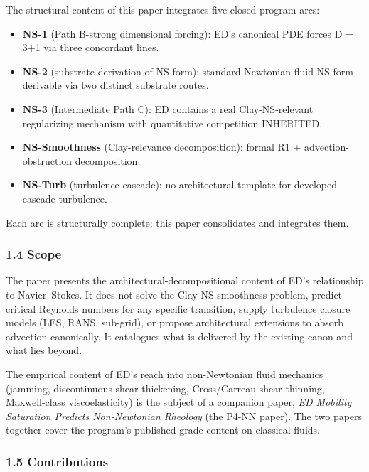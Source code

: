 \documentclass[
  11pt,a4paper]{article}
\providecommand{\tightlist}{%
  \setlength{\itemsep}{0pt}\setlength{\parskip}{0pt}}
\begin{document}
The structural content of this paper integrates five closed program
arcs:

\begin{itemize}
\tightlist
\item
  \textbf{NS-1} (Path B-strong dimensional forcing): ED's canonical PDE
  forces D = 3+1 via three concordant lines.
\item
  \textbf{NS-2} (substrate derivation of NS form): standard
  Newtonian-fluid NS form derivable via two distinct substrate routes.
\item
  \textbf{NS-3} (Intermediate Path C): ED contains a real
  Clay-NS-relevant regularizing mechanism with quantitative competition
  INHERITED.
\item
  \textbf{NS-Smoothness} (Clay-relevance decomposition): formal R1 +
  advection-obstruction decomposition.
\item
  \textbf{NS-Turb} (turbulence cascade): no architectural template for
  developed-cascade turbulence.
\end{itemize}

Each arc is structurally complete; this paper consolidates and
integrates them.

\subsubsection{1.4 Scope}\label{scope}

The paper presents the architectural-decompositional content of ED's
relationship to Navier--Stokes. It does not solve the Clay-NS smoothness
problem, predict critical Reynolds numbers for any specific transition,
supply turbulence closure models (LES, RANS, sub-grid), or propose
architectural extensions to absorb advection canonically. It catalogues
what is delivered by the existing canon and what lies beyond.

The empirical content of ED's reach into non-Newtonian fluid mechanics
(jamming, discontinuous shear-thickening, Cross/Carreau shear-thinning,
Maxwell-class viscoelasticity) is the subject of a companion paper,
\emph{ED Mobility Saturation Predicts Non-Newtonian Rheology} (the P4-NN
paper). The two papers together cover the program's published-grade
content on classical fluids.

\subsubsection{1.5 Contributions}\label{contributions}
\end{document}
